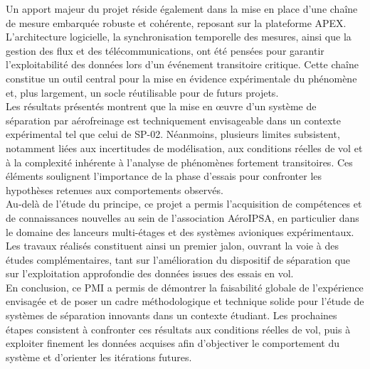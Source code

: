 Un apport majeur du projet réside également dans la mise en place d’une chaîne de mesure embarquée robuste et cohérente, reposant
sur la plateforme APEX. L’architecture logicielle, la synchronisation temporelle des mesures, ainsi que la gestion des flux et
des télécommunications, ont été pensées pour garantir l’exploitabilité des données lors d’un événement transitoire critique.
Cette chaîne constitue un outil central pour la mise en évidence expérimentale du phénomène et, plus largement, un socle
réutilisable pour de futurs projets.\\

Les résultats présentés montrent que la mise en œuvre d’un système de séparation par aérofreinage est techniquement envisageable
dans un contexte expérimental tel que celui de SP-02. Néanmoins, plusieurs limites subsistent, notamment liées aux incertitudes
de modélisation, aux conditions réelles de vol et à la complexité inhérente à l’analyse de phénomènes fortement transitoires.
Ces éléments soulignent l’importance de la phase d’essais pour confronter les hypothèses retenues aux comportements observés.\\

Au-delà de l’étude du principe, ce projet a permis l’acquisition de compétences et de connaissances nouvelles au sein de
l’association AéroIPSA, en particulier dans le domaine des lanceurs multi-étages et des systèmes avioniques expérimentaux. Les
travaux réalisés constituent ainsi un premier jalon, ouvrant la voie à des études complémentaires, tant sur l’amélioration du
dispositif de séparation que sur l’exploitation approfondie des données issues des essais en vol.\\

En conclusion, ce PMI a permis de démontrer la faisabilité globale de l’expérience envisagée et de poser un cadre méthodologique
et technique solide pour l’étude de systèmes de séparation innovants dans un contexte étudiant. Les prochaines étapes consistent
à confronter ces résultats aux conditions réelles de vol, puis à exploiter finement les données acquises afin d’objectiver le
comportement du système et d’orienter les itérations futures.

\newpage
